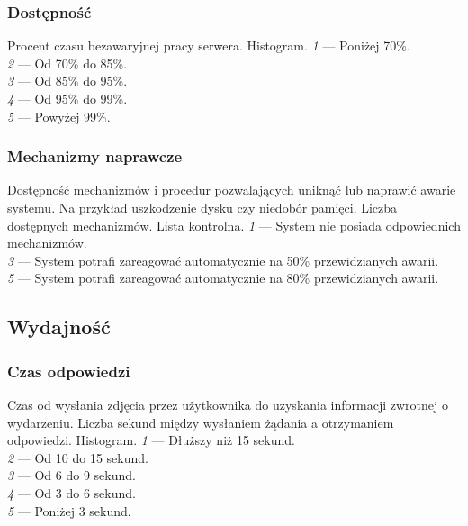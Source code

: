 \documentclass[10pt]{dokument-ppi}
\begin{document}
\subsubsection{Dostępność}
\begin{requirement}
    \metric*%
        Procent czasu bezawaryjnej pracy serwera.
    \tool%
        Histogram.
    \scale%
        \emph{1} --- Poniżej 70\%.\\
        \emph{2} --- Od 70\% do 85\%.\\
        \emph{3} --- Od 85\% do 95\%.\\
        \emph{4} --- Od 95\% do 99\%.\\
        \emph{5} --- Powyżej 99\%.
\end{requirement}

\subsubsection{Mechanizmy naprawcze}
\begin{requirement}
    \desc%
        Dostępność mechanizmów i procedur pozwalających uniknąć lub naprawić
        awarie systemu. Na przykład uszkodzenie dysku czy niedobór pamięci.
    \metric%
        Liczba dostępnych mechanizmów.
    \tool%
        Lista kontrolna.
    \scale%
        \emph{1} --- System nie posiada odpowiednich mechanizmów.\\
        \emph{3} --- System potrafi zareagować automatycznie na 50\% przewidzianych awarii.\\
        \emph{5} --- System potrafi zareagować automatycznie na 80\% przewidzianych awarii.
\end{requirement}


\subsection{Wydajność}

\subsubsection{Czas odpowiedzi}
\begin{requirement}
    \desc%
        Czas od wysłania zdjęcia przez użytkownika do uzyskania informacji
        zwrotnej o wydarzeniu.
    \metric%
        Liczba sekund między wysłaniem żądania a otrzymaniem odpowiedzi.
    \tool%
        Histogram.
    \scale%
        \emph{1} --- Dłuższy niż 15 sekund.\\
        \emph{2} --- Od 10 do 15 sekund.\\
        \emph{3} --- Od 6 do 9 sekund.\\
        \emph{4} --- Od 3 do 6 sekund.\\
        \emph{5} --- Poniżej 3 sekund.
\end{requirement}
\end{document}
